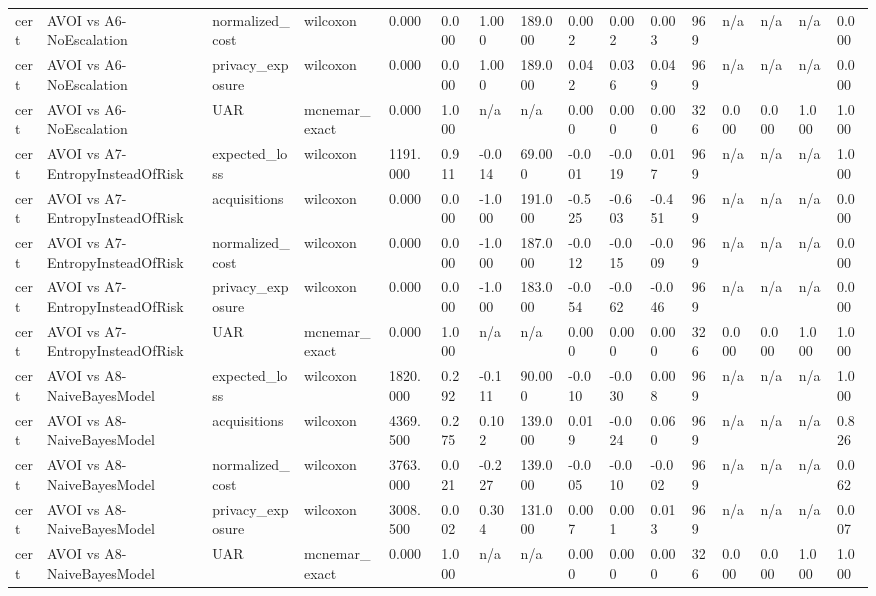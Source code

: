 \begin{table}[!ht]
{\begin{tabular}{llllllllllllllll}
cert & AVOI vs A6-NoEscalation & normalized\_cost & wilcoxon & 0.000 & 0.000 & 1.000 & 189.000 & 0.002 & 0.002 & 0.003 & 969 & n/a & n/a & n/a & 0.000 \\
cert & AVOI vs A6-NoEscalation & privacy\_exposure & wilcoxon & 0.000 & 0.000 & 1.000 & 189.000 & 0.042 & 0.036 & 0.049 & 969 & n/a & n/a & n/a & 0.000 \\
cert & AVOI vs A6-NoEscalation & UAR & mcnemar\_exact & 0.000 & 1.000 & n/a & n/a & 0.000 & 0.000 & 0.000 & 326 & 0.000 & 0.000 & 1.000 & 1.000 \\
cert & AVOI vs A7-EntropyInsteadOfRisk & expected\_loss & wilcoxon & 1191.000 & 0.911 & -0.014 & 69.000 & -0.001 & -0.019 & 0.017 & 969 & n/a & n/a & n/a & 1.000 \\
cert & AVOI vs A7-EntropyInsteadOfRisk & acquisitions & wilcoxon & 0.000 & 0.000 & -1.000 & 191.000 & -0.525 & -0.603 & -0.451 & 969 & n/a & n/a & n/a & 0.000 \\
cert & AVOI vs A7-EntropyInsteadOfRisk & normalized\_cost & wilcoxon & 0.000 & 0.000 & -1.000 & 187.000 & -0.012 & -0.015 & -0.009 & 969 & n/a & n/a & n/a & 0.000 \\
cert & AVOI vs A7-EntropyInsteadOfRisk & privacy\_exposure & wilcoxon & 0.000 & 0.000 & -1.000 & 183.000 & -0.054 & -0.062 & -0.046 & 969 & n/a & n/a & n/a & 0.000 \\
cert & AVOI vs A7-EntropyInsteadOfRisk & UAR & mcnemar\_exact & 0.000 & 1.000 & n/a & n/a & 0.000 & 0.000 & 0.000 & 326 & 0.000 & 0.000 & 1.000 & 1.000 \\
cert & AVOI vs A8-NaiveBayesModel & expected\_loss & wilcoxon & 1820.000 & 0.292 & -0.111 & 90.000 & -0.010 & -0.030 & 0.008 & 969 & n/a & n/a & n/a & 1.000 \\
cert & AVOI vs A8-NaiveBayesModel & acquisitions & wilcoxon & 4369.500 & 0.275 & 0.102 & 139.000 & 0.019 & -0.024 & 0.060 & 969 & n/a & n/a & n/a & 0.826 \\
cert & AVOI vs A8-NaiveBayesModel & normalized\_cost & wilcoxon & 3763.000 & 0.021 & -0.227 & 139.000 & -0.005 & -0.010 & -0.002 & 969 & n/a & n/a & n/a & 0.062 \\
cert & AVOI vs A8-NaiveBayesModel & privacy\_exposure & wilcoxon & 3008.500 & 0.002 & 0.304 & 131.000 & 0.007 & 0.001 & 0.013 & 969 & n/a & n/a & n/a & 0.007 \\
cert & AVOI vs A8-NaiveBayesModel & UAR & mcnemar\_exact & 0.000 & 1.000 & n/a & n/a & 0.000 & 0.000 & 0.000 & 326 & 0.000 & 0.000 & 1.000 & 1.000 \\
\bottomrule
\end{tabular}}
\end{table}
